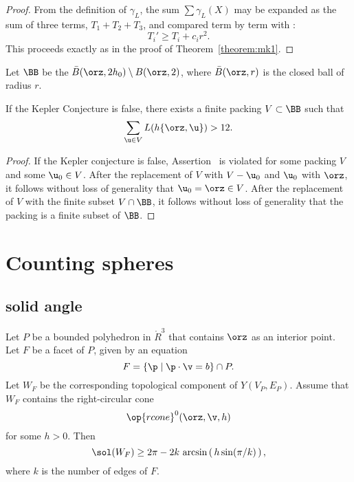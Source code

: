 \begin{proof}
From the definition of $\gamma_L$, the sum $\sum \gamma_L(X)$ may be
expanded as the sum of three terms, $T_1+T_2+T_3$, and compared term
by term with :
\begin{displaymath}
T_i' \ge T_i + c_i r^2.
\end{displaymath}
This proceeds exactly as in the proof of Theorem~\ref{theorem:mk1}.
\end{proof}

\begin{definition}[$\BB$]
Let $\BB$ be the
 $\bar B(\orz,2h_0)\setminus B(\orz,2)$, where
$\bar B(\orz,r)$ is the closed ball of radius $r$.
\end{definition}


\begin{corollary}\label{cor:CE} 
If the Kepler Conjecture is false,
there exists a finite packing $V\subset\BB$ such that
\begin{equation}\label{eqn:CE}
\sum_{ \u\in V} L(h\{\orz, \u\}) > 12.
\end{equation}
\end{corollary}

\begin{proof} If the Kepler conjecture is false,
Assertion~ is violated for some packing $ V$ and some
$ \u_0\in V$.  After the replacement of $ V$ with $ V - \u_0$ and $
\u_0$ with $\orz$, it follows without loss of generality that $
\u_0=\orz\in V$.  After the replacement of $ V$ with the finite
subset
$V\cap \BB$,
it follows without loss of generality that the packing is a finite subset of $\BB$.
\end{proof}



\section{Counting spheres}


\subsection{solid angle}
%
%


\begin{lemma}\label{lemma:ngon}
Let $P$ be a bounded polyhedron in $\ring{R}^3$ that contains $\orz$
as an interior point.  Let $F$ be a facet of $P$, given by an
equation
\begin{displaymath}
F = \{\p \mid \p \cdot \v = b\} \cap P.
\end{displaymath} 
Let $W_F$ be the corresponding topological component of $Y(V_P,E_P)$.  
Assume that $W_F$ contains the right-circular cone 
\begin{displaymath}
\op{rcone}^0(\orz,\v,h)
\end{displaymath}
for some $h>0$.
Then 
\begin{displaymath}
\sol(W_F) \ge 
2\pi - 2 k \,\arcsin\left(\,h\sin(\pi/k)\,\right),
\end{displaymath}
where $k$ is the number of edges of $F$.
\end{lemma}

